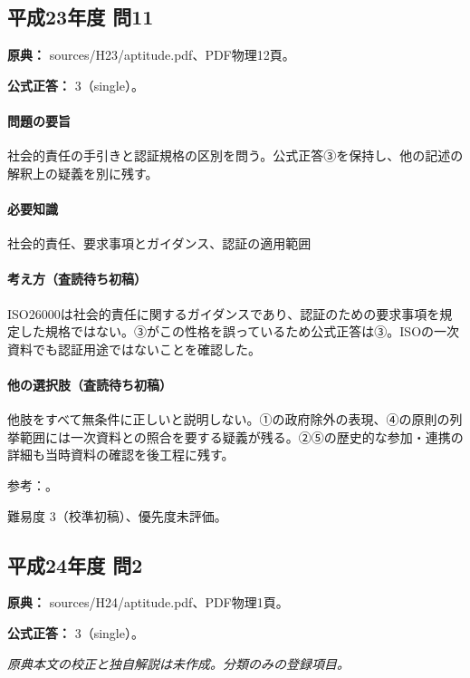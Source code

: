 \subsection{平成23年度 問11}
\label{q:h23-reg-apt-11}

\noindent\textbf{原典：} sources/H23/aptitude.pdf、PDF物理12頁。

\textbf{公式正答：} 3（single）。

\paragraph{問題の要旨} 社会的責任の手引きと認証規格の区別を問う。公式正答③を保持し、他の記述の解釈上の疑義を別に残す。

\paragraph{必要知識} 社会的責任、要求事項とガイダンス、認証の適用範囲

\paragraph{考え方（査読待ち初稿）} ISO26000は社会的責任に関するガイダンスであり、認証のための要求事項を規定した規格ではない。③がこの性格を誤っているため公式正答は③。ISOの一次資料でも認証用途ではないことを確認した。

\paragraph{他の選択肢（査読待ち初稿）} 他肢をすべて無条件に正しいと説明しない。①の政府除外の表現、④の原則の列挙範囲には一次資料との照合を要する疑義が残る。②⑤の歴史的な参加・連携の詳細も当時資料の確認を後工程に残す。

\par 参考：\cite{iso26000}。

\par 難易度 3（校準初稿）、優先度未評価。

\subsection{平成24年度 問2}
\label{q:h24-reg-apt-02}

\noindent\textbf{原典：} sources/H24/aptitude.pdf、PDF物理1頁。

\textbf{公式正答：} 3（single）。

\par\textit{原典本文の校正と独自解説は未作成。分類のみの登録項目。}


